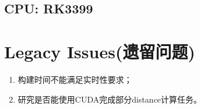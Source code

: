 \documentclass[a4paper, 11pt, UTF8]{ctexart}%
\begin{document}
\subsection{CPU: RK3399}

\section{Legacy Issues(遗留问题)}

\begin{enumerate}
  \item 构建时间不能满足实时性要求；
  \item 研究是否能使用CUDA完成部分distance计算任务。
\end{enumerate}
%
%
%
%
%
%
\end{document}
